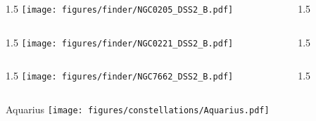 \documentclass[final]{beamer}
\newlength{\colwidth}
\begin{document}
\begin{frame}[t]{}
  \begin{columns}[T]
    \begin{column}{1.5\colwidth}
      \centering
      \texttt{[image: figures/finder/NGC0205\_DSS2\_B.pdf]}
    \end{column}
    \begin{column}{1.5\colwidth}
      \Large
      
    \end{column}
  \end{columns}
  \vspace{\fill}
  \begin{columns}[T]
    \begin{column}{1.5\colwidth}
      \centering
      \texttt{[image: figures/finder/NGC0221\_DSS2\_B.pdf]}
    \end{column}
    \begin{column}{1.5\colwidth}
      \Large
      
    \end{column}
  \end{columns}
\end{frame}


\begin{frame}[t]{}
  \begin{columns}[T]
    \begin{column}{1.5\colwidth}
      \centering
      \texttt{[image: figures/finder/NGC7662\_DSS2\_B.pdf]}
    \end{column}
    \begin{column}{1.5\colwidth}
      \Large
      
    \end{column}
  \end{columns}
  \vspace{\fill}
\end{frame}


\begin{frame}[t]{\LARGE Aquarius}
  \centering
  \texttt{[image: figures/constellations/Aquarius.pdf]}
\end{frame}

\end{document}

